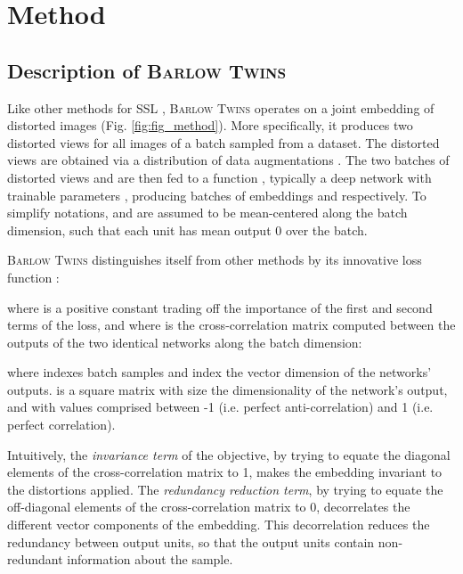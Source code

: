 \documentclass{article}
\newcommand{\AlgoName}{\textsc{Barlow Twins}}
\begin{document}
 \section{Method}


\subsection{Description of \AlgoName{}}








Like other methods for SSL \cite{caron2020swav,grill2020bootstrap,chen2020simple,he2019momentum,misra2019self}, \AlgoName{} operates on a joint embedding of distorted images (Fig. \ref{fig:fig_method}). More specifically, it produces two distorted views for all images of a batch  sampled from a dataset. The distorted views are obtained via a distribution of data augmentations . The two batches of distorted views  and  are then fed to a function , typically a deep network with trainable parameters , producing batches of embeddings  and  respectively. To simplify notations,  and  are assumed to be mean-centered along the batch dimension, such that each unit has mean output 0 over the batch. 

\AlgoName{} distinguishes itself from other methods by its innovative loss function :



where  is a positive constant trading off the importance of the first and second terms of the loss, and where  is the cross-correlation matrix computed between the outputs of the two identical networks along the batch dimension:



where  indexes batch samples and  index the vector dimension of the networks' outputs.  is a square matrix with size the dimensionality of the network's output, and with values comprised between -1 (i.e. perfect anti-correlation) and 1 (i.e. perfect correlation). 



Intuitively, the \emph{invariance term} of the objective, by trying to equate the diagonal elements of the cross-correlation matrix to 1, makes the embedding invariant to the distortions applied.  The \emph{redundancy reduction term}, by trying to equate the off-diagonal elements of the cross-correlation matrix to 0, decorrelates the different vector components of the embedding. This decorrelation reduces the redundancy between output units, so that the output units contain non-redundant information about the sample. 
\end{document}
